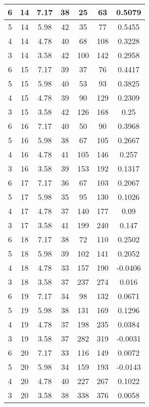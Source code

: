 \documentclass[letterpaper, 12pt]{article}
\begin{document}
\begin{longtable}{|c|c|c|c|c|c|c|}
\hline
6 & 14 & 7.17 & 38 & 25 & 63 & 0.5079 \\
\hline
5 & 14 & 5.98 & 42 & 35 & 77 & 0.5455 \\
\hline
4 & 14 & 4.78 & 40 & 68 & 108 & 0.3228 \\
\hline
3 & 14 & 3.58 & 42 & 100 & 142 & 0.2958 \\
\hline
6 & 15 & 7.17 & 39 & 37 & 76 & 0.4417 \\
\hline
5 & 15 & 5.98 & 40 & 53 & 93 & 0.3825 \\
\hline
4 & 15 & 4.78 & 39 & 90 & 129 & 0.2309 \\
\hline
3 & 15 & 3.58 & 42 & 126 & 168 & 0.25 \\
\hline
6 & 16 & 7.17 & 40 & 50 & 90 & 0.3968 \\
\hline
5 & 16 & 5.98 & 38 & 67 & 105 & 0.2667 \\
\hline
4 & 16 & 4.78 & 41 & 105 & 146 & 0.257 \\
\hline
3 & 16 & 3.58 & 39 & 153 & 192 & 0.1317 \\
\hline
6 & 17 & 7.17 & 36 & 67 & 103 & 0.2067 \\
\hline
5 & 17 & 5.98 & 35 & 95 & 130 & 0.1026 \\
\hline
4 & 17 & 4.78 & 37 & 140 & 177 & 0.09 \\
\hline
3 & 17 & 3.58 & 41 & 199 & 240 & 0.147 \\
\hline
6 & 18 & 7.17 & 38 & 72 & 110 & 0.2502 \\
\hline
5 & 18 & 5.98 & 39 & 102 & 141 & 0.2052 \\
\hline
4 & 18 & 4.78 & 33 & 157 & 190 & -0.0406 \\
\hline
3 & 18 & 3.58 & 37 & 237 & 274 & 0.016 \\
\hline
6 & 19 & 7.17 & 34 & 98 & 132 & 0.0671 \\
\hline
5 & 19 & 5.98 & 38 & 131 & 169 & 0.1296 \\
\hline
4 & 19 & 4.78 & 37 & 198 & 235 & 0.0384 \\
\hline
3 & 19 & 3.58 & 37 & 282 & 319 & -0.0031 \\
\hline
6 & 20 & 7.17 & 33 & 116 & 149 & 0.0072 \\
\hline
5 & 20 & 5.98 & 34 & 159 & 193 & -0.0143 \\
\hline
4 & 20 & 4.78 & 40 & 227 & 267 & 0.1022 \\
\hline
3 & 20 & 3.58 & 38 & 338 & 376 & 0.0058 \\
\hline
\end{longtable}
\end{document}
